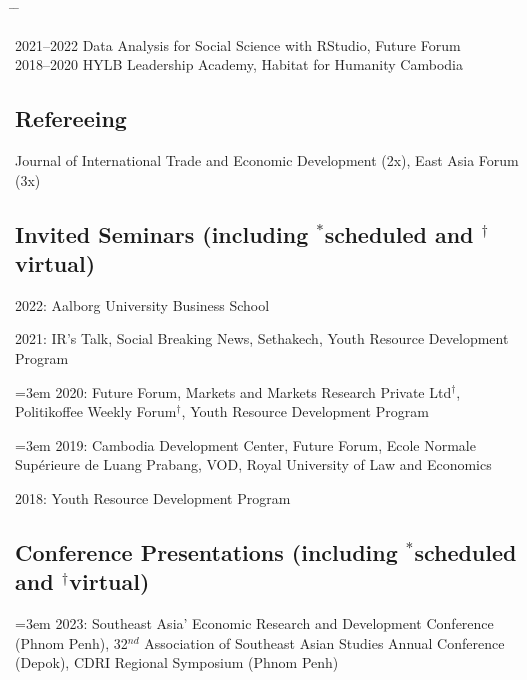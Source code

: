 \documentclass[10pt,a4paper]{article}
\newcommand{\tabbedblock}[1]{

	\begin{tabbing}
		\hspace{3cm} \= \hspace{4cm} \= \kill
		#1
	\end{tabbing}
}
\begin{document}
\tabbedblock{
	2021--2022 \> Data Analysis for Social Science with RStudio, Future Forum\\
	
	2018--2020 \> HYLB Leadership Academy, Habitat for Humanity Cambodia
}

\subsection*{Refereeing}
	
	Journal of International Trade and Economic Development (2x), East Asia Forum (3x)

\subsection*{Invited Seminars (including $^\ast$scheduled and $^\dag$virtual)}

	2022: Aalborg University Business School

	2021: IR’s Talk, Social Breaking News, Sethakech, Youth Resource Development Program
				
\hangindent=3em
	2020: Future Forum, Markets and Markets Research Private Ltd$^\dag$, Politikoffee Weekly Forum$^\dag$, Youth Resource Development Program

\hangindent=3em
	2019: Cambodia Development Center, Future Forum, Ecole Normale Supérieure de Luang Prabang, VOD, Royal University of Law and Economics

	2018: Youth Resource Development Program
	
\subsection*{Conference Presentations (including $^\ast$scheduled and $^\dag$virtual)}

\hangindent=3em
2023:  Southeast Asia' Economic Research and Development Conference (Phnom Penh), 32$^{nd}$ Association of Southeast Asian Studies Annual Conference (Depok), CDRI Regional Symposium (Phnom Penh)
\end{document}
